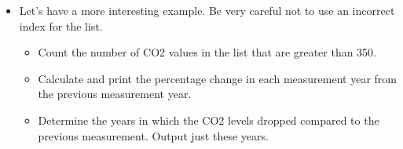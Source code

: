 \documentclass[letterpaper,10pt,english]{sphinxmanual}
\begin{document}
\begin{itemize}
\begin{sphinxVerbatim}[commandchars=\\\{\}]
  
      \PYG{p}{[}\PYG{p}{]}\PYG{p}{[}\PYG{p}{]}
      

 
\end{sphinxVerbatim}

\item {} 
Let’s have a more interesting example. Be very careful not to use
an incorrect index for the list.
\begin{itemize}
\item {} 
Count the number of CO2 values in the list that are greater
than 350.

\item {} 
Calculate and print the percentage change in each measurement year
from the previous measurement year.

\item {} 
Determine the years in which the CO2 levels dropped compared to the
previous measurement.  Output just these years.

\end{itemize}

\end{itemize}
\end{document}
